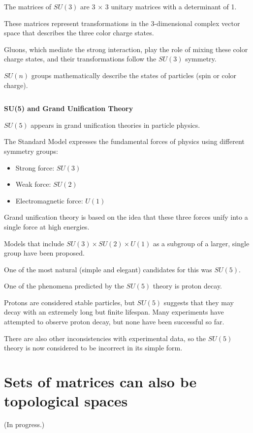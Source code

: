 \documentclass[uplatex,a4j,12pt,dvipdfmx]{jsarticle}
\begin{document}
The matrices of $SU(3)$ are 3 $\times$ 3 unitary matrices with a determinant of 1.

These matrices represent transformations in the 3-dimensional complex vector space that describes the three color charge states.

Gluons, which mediate the strong interaction, play the role of mixing these color charge states, and their transformations follow the $SU(3)$ symmetry.

$SU(n)$ groups mathematically describe the states of particles (spin or color charge).

${}$

\textbf{SU(5) and Grand Unification Theory}

$SU(5)$ appears in grand unification theories in particle physics.

The Standard Model expresses the fundamental forces of physics using different symmetry groups:
\begin{itemize}
	\item Strong force: $SU(3)$
	\item Weak force: $SU(2)$
	\item Electromagnetic force: $U(1)$
\end{itemize}

Grand unification theory is based on the idea that these three forces unify into a single force at high energies.

Models that include $SU(3) \times SU(2) \times U(1)$ as a subgroup of a larger, single group have been proposed.

One of the most natural (simple and elegant) candidates for this was $SU(5)$.

One of the phenomena predicted by the $SU(5)$ theory is proton decay.

Protons are considered stable particles, but $SU(5)$ suggests that they may decay with an extremely long but finite lifespan.
Many experiments have attempted to observe proton decay, but none have been successful so far.

There are also other inconsistencies with experimental data, so the $SU(5)$ theory is now considered to be incorrect in its simple form.


\section{Sets of matrices can also be topological spaces}

(In progress.)
\end{document}
